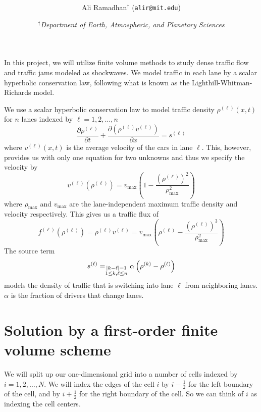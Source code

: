 \documentclass[11pt]{article}
\title{\spacedlowsmallcaps{6.339: Numerical Methods for Partial Differential Equations}\\ \spacedlowsmallcaps{Project two: Finite Volume Methods}}
\author{Ali Ramadhan$^\text{†}$ (\texttt{alir@mit.edu})}
\date{\textit{$^\text{†}$Department of Earth, Atmospheric, and Planetary Sciences}}
\let\sumop\relax
\begin{document}
\maketitle

In this project, we will utilize finite volume methods to study dense traffic flow and traffic jams modeled as shockwaves. We model traffic in each lane by a scalar hyperbolic conservation law, following what is known as the Lighthill-Whitman-Richards model.

We use a scalar hyperbolic conservation law to model traffic density $\rho^{(\ell)}(x,t)$ for $n$ lanes indexed by $\ell = 1,2,\dots,n$
\begin{equation} \label{eq:conservationLaw}
	\frac{\partial \rho^{(\ell)}}{\partial t} + \frac{\partial (\rho^{(\ell)} v^{(\ell)})}{\partial x} = s^{(\ell)}
\end{equation}
where $v^{(\ell)}(x,t)$ is the average velocity of the cars in lane $\ell$. This, however, provides us with only one equation for two unknowns and thus we specify the velocity by
\begin{equation} \label{eq:velocity}
	v^{(\ell)}(\rho^{(\ell)}) = v_\mathrm{max} \left( 1 - \frac{\left(\rho^{(\ell)}\right)^2}{\rho_\mathrm{max}^2} \right)
\end{equation}
where $\rho_\mathrm{max}$ and $v_\mathrm{max}$ are the lane-independent maximum traffic density and velocity respectively. This gives us a traffic flux of 
\begin{equation} \label{eq:flux}
f^{(\ell)}(\rho^{(\ell)}) = \rho^{(\ell)} v^{(\ell)} = v_\mathrm{max} \left( \rho^{(\ell)} - \frac{\left(\rho^{(\ell)}\right)^3}{\rho_\mathrm{max}^2} \right)
\end{equation}
The source term
\begin{equation} \label{eq:source}
	s^{(\ell)} = \sumop_{\substack{|k-\ell|=1 \\ 1 \le k,\ell \le n}} \alpha \left( \rho^{(k)} - \rho^{(\ell)} \right)
\end{equation}
models the density of traffic that is switching into lane $\ell$ from neighboring lanes. $\alpha$ is the fraction of drivers that change lanes.

\section{Solution by a first-order finite volume scheme}

We will split up our one-dimensional grid into a number of cells indexed by $i=1,2,\ldots,N$. We will index the edges of the cell $i$ by $i-\frac{1}{2}$ for the left boundary of the cell, and by $i+\frac{1}{2}$ for the right boundary of the cell. So we can think of $i$ as indexing the cell centers.
\end{document}
